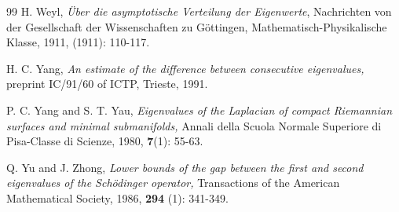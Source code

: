\documentclass[12pt]{article}
\numberwithin{equation}{section}
\begin{document}
\begin{thebibliography}{99}
H. Weyl, {\it\"{U}ber die asymptotische Verteilung der Eigenwerte}, Nachrichten von der Gesellschaft der
Wissenschaften zu G\"{o}ttingen, Mathematisch-Physikalische Klasse, 1911, (1911): 110-117.

H. C. Yang, {\it An estimate of the difference between consecutive eigenvalues,} preprint IC/91/60 of
ICTP, Trieste, 1991.

P. C. Yang and S. T. Yau, {\it Eigenvalues of the Laplacian of compact Riemannian surfaces and minimal
submanifolds,} Annali della Scuola Normale Superiore di Pisa-Classe di Scienze, 1980, {\bf 7}(1): 55-63.

Q.  Yu  and  J.  Zhong, {\it Lower  bounds  of  the  gap  between  the  first  and  second  eigenvalues  of  the
Sch\"{o}dinger operator,}  Transactions of the American Mathematical Society,  1986, {\bf 294} (1): 341-349.


\end{thebibliography}
\end{document}
